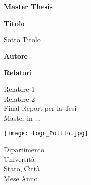 \begin{titlepage}
    \begin{center}
        \large
        \textbf{Master Thesis\\}
        
        \huge
        \vspace{1cm}
        \textbf{Titolo\\}
        
        \Large
        \vspace{0.5cm}
        Sotto Titolo\\
        
        \vspace{1cm}
        
        \textbf{Autore\\}
        
        \vspace{1.5cm}
        
        \textbf{Relatori\\}
        
        Relatore 1\\
        Relatore 2\\
        \Large
        \vfill
        Final Report per la Tesi\\
        Master in ...
        
        \vspace{0.8cm}
        
        \texttt{[image: logo\_Polito.jpg]}
        
        \vspace{0.8cm}
        Dipartimento\\
        Università\\
        Stato, Città\\
        Mese Anno
    \end{center}
\end{titlepage}
